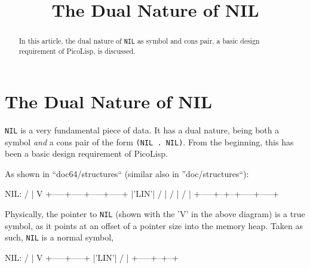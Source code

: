 \title{The Dual Nature of NIL}

\maketitle





% 

\begin{abstract}
  In this article, the dual nature of \texttt{NIL} as symbol and cons
  pair, a basic design requirement of PicoLisp, is discussed. 
\end{abstract}

\section{The Dual Nature of NIL}
\label{sec:dual-nature-nil}

\texttt{NIL} is a very fundamental piece of data. It has a dual
nature, being both a symbol \textit{and} a cons pair of the form
\texttt{(NIL . NIL)}. From the beginning, this has been a basic design
requirement of PicoLisp.

As shown in ``doc64/structures`` (similar also in ''doc/structures``):

\begin{wideverbatim}
      NIL:  /
            |
            V
      +-----+-----+-----+-----+
      |'LIN'|  /  |  /  |  /  |
      +-----+--+--+-----+-----+
\end{wideverbatim}

Physically, the pointer to \texttt{NIL} (shown with the 'V' in the
above diagram) is a true symbol, as it points at an offset of a
pointer size into the memory heap. Taken as such, \texttt{NIL} is a
normal symbol,

\begin{wideverbatim}
      NIL:  /
            |
            V
      +-----+-----+
      |'LIN'|  /  |
      +-----+--+--+
\end{wideverbatim}

